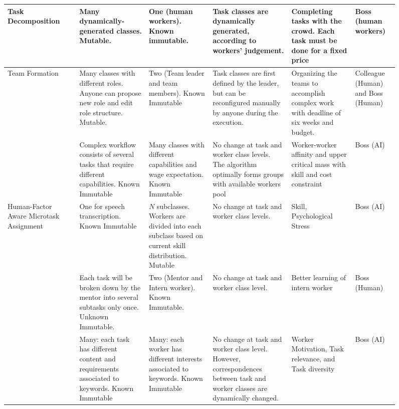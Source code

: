 \begin{figure}
\begin{tabular}{|p{15mm}|p{10mm}|p{24mm}|p{24mm}|p{35mm}|p{24mm}|p{13mm}|}
\hline
Task Decomposition&\cite{KCH12} &Many dynamically-generated classes. Mutable.  &One (human workers). Known immutable. &Task classes are dynamically generated,
according to workers' judgement.
&Completing tasks with the crowd. Each task must be done for a fixed price&Boss (human workers)\\
\hline
Team Formation &
\cite{VRT+17}
& Many classes with different roles. Anyone can propose new role and edit role structure.
Mutable.
& Two (Team leader and team members). Known Immutable
& Task classes are first defined by the leader, but can be reconfigured manually by anyone during the execution.
&Organizing the teams to accomplish complex work with deadline of six weeks and budget.
& Colleague (Human) and Boss (Human)\\
\cline{2-7}
&\cite{RRT+19}&Complex workflow consists of several tasks that require different capabilities.
Known Immutable &
Many classes with different capabilities and wage expectation. Known Immutable &
No change at task and worker class levels. The algorithm optimally forms groups with available workers pool &
Worker-worker affinity and upper critical mass with skill and cost constraint&Boss (AI)\\
\hline
Human-Factor Aware Microtask Assignment&
\cite{KMS+18}&One for speech transcription. Known Immutable & $N$ subclasses. Workers are divided into each subclass based on current skill distribution.
Mutable & No change at task and worker class levels. &Skill, Psychological Stress&Boss (AI)\\
\cline{2-7}
& \cite{SSL+16}&Each task will be broken down by the mentor into several subtasks only once. Unknown Immutable.
& Two (Mentor and Intern worker). Known Immutable.
& No change at task and worker class level.
& Better learning of intern worker
& Boss (Human)\\
\cline{2-7}
&\cite{PAS+18}&Many: each task has different content and requirements associated to keywords. Known Immutable & Many: each worker has different interests associated to keywords. 
Known Immutable &
No change at task and worker class level.
However, correspondences between task and worker classes are dynamically changed.
&Worker Motivation, Task relevance, and Task diversity& Boss (AI)\\


\end{tabular}
\end{figure}
